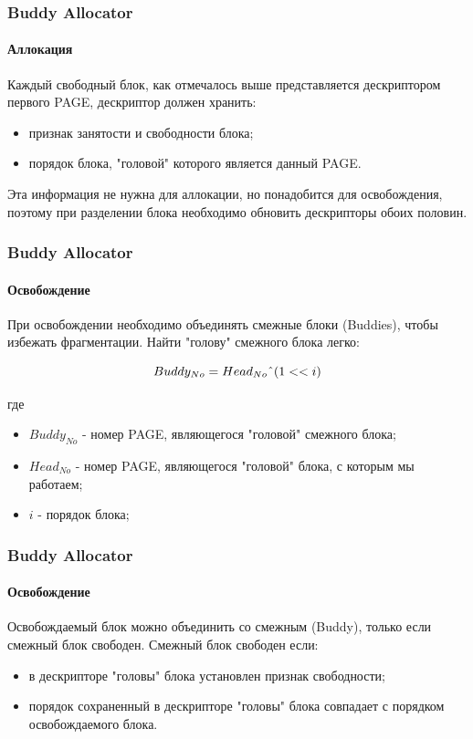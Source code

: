 \begin{frame}
\frametitle{Buddy Allocator}
\framesubtitle{Аллокация}

Каждый свободный блок, как отмечалось выше представляется дескриптором первого PAGE, дескриптор должен хранить:

\begin{itemize}
  \item признак занятости и свободности блока;
  \item порядок блока, "головой" которого является данный PAGE.
\end{itemize}

Эта информация не нужна для аллокации, но понадобится для освобождения, поэтому
при разделении блока необходимо обновить дескрипторы обоих половин.

\end{frame}

\begin{frame}
\frametitle{Buddy Allocator}
\framesubtitle{Освобождение}

При освобождении необходимо объединять смежные блоки (Buddies), чтобы избежать фрагментации. Найти "голову" смежного блока легко:

\[
	Buddy_{No} = Head_{No} \char`\^ (1 << i)
\]

где
\begin{itemize}
  \item $Buddy_{No}$ - номер PAGE, являющегося "головой" смежного блока;
  \item $Head_{No}$ - номер PAGE, являющегося "головой" блока, с которым мы работаем;
  \item $i$ - порядок блока;
\end{itemize}

\end{frame}

\begin{frame}
\frametitle{Buddy Allocator}
\framesubtitle{Освобождение}

Освобождаемый блок можно объединить со смежным (Buddy), только если смежный блок свободен. Смежный блок свободен если:

\begin{itemize}
  \item в дескрипторе "головы" блока установлен признак свободности;
  \item порядок сохраненный в дескрипторе "головы" блока совпадает с порядком освобождаемого блока.
\end{itemize}
\end{frame}

